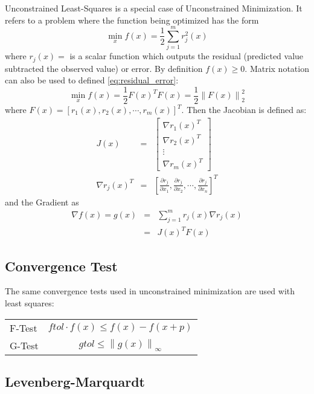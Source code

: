 \documentclass[peerreview,compsoc,onecolumn]{IEEEtran}
\newcommand{\norm}[1]{\left\lVert#1\right\rVert}
\begin{document}
Unconstrained Least-Squares is a special case of Unconstrained Minimization. It refers to a problem where the function being optimized has the form
\begin{equation}
\label{eq:residual_error}
\min\limits_{x} f(x)=\frac{1}{2}\sum^m_{j=1} r^2_j(x)
\end{equation}
where $r_j(x) = $ is a scalar function which outputs the residual (predicted value subtracted the observed value) or error. By definition $f(x) \ge 0$. Matrix notation can also be used to defined \ref{eq:residual_error}:
\begin{equation}
\min\limits_{x} f(x) =\frac{1}{2} F(x)^T F(x) = \frac{1}{2} \norm{F(x)}^2_2
\end{equation}
where $F(x) = [ r_1(x) , r_2(x) , \cdots , r_m(x) ]^T$. Then the Jacobian is defined as:
\begin{eqnarray}
J(x) &=&  \left[ \begin{array}{c}\nabla r_1(x)^T \\ \nabla r_2(x)^T \\ \vdots \\ \nabla r_m(x)^T \end{array}\right] \\
\nabla r_j(x)^T &=& \left[ \frac{\partial r_j}{\partial x_1},\frac{\partial r_j}{\partial x_2}, \cdots , \frac{\partial r_j}{\partial x_n} \right]^T
\end{eqnarray}
and the Gradient as
\begin{eqnarray}
\nabla f(x) = g(x) &=& \sum^m_{j=1}r_j(x)\nabla r_j(x) \\
&=& J(x)^T F(x)
\end{eqnarray}

\subsection{Convergence Test}

The same convergence tests used in unconstrained minimization are used with least squares:
\begin{center}
\begin{tabular}{lc}
F-Test & $ftol \cdot f(x)  \leq f(x) - f(x+p)$ \\
G-Test & $gtol \leq \norm{g(x)}_\infty$ \\
\end{tabular}
\end{center}

\subsection{Levenberg-Marquardt}
\end{document}
